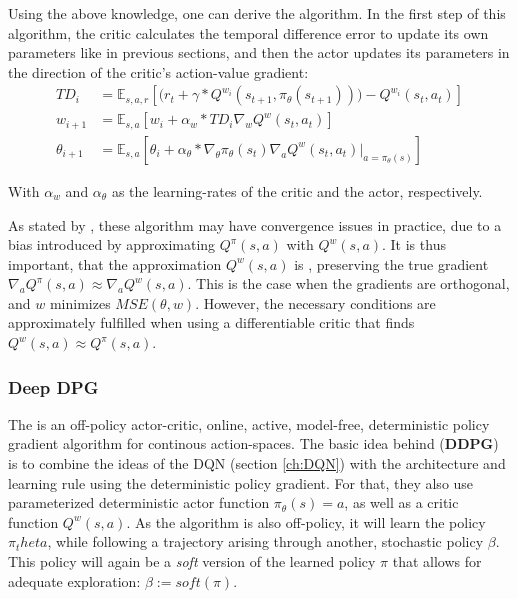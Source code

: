 \noindent Using the above knowledge, one can derive the  algorithm. In the first step of this algorithm, the critic calculates the temporal difference error to update its own parameters like in previous sections, and then the actor updates its parameters in the direction of the critic's action-value gradient:
\begin{align}
	TD_i    &= \mathds{E}_{s,a,r} \left[ \big( r_t + \gamma * Q^{w_i}(s_{t+1}, \pi_{\theta}(s_{t+1})) \big) - Q^{w_i}(s_t, a_t) \right] \label{eq:td_dpg}\\
	w_{i+1} &= \mathds{E}_{s,a} \left[  w_i + \alpha_w * TD_i \nabla_w Q^w(s_t, a_t) \right] \label{eq:critic_dpg} \\
	\theta_{i+1} &= \mathds{E}_{s,a} \left[ \theta_i + \alpha_\theta * \nabla_\theta \pi_\theta(s_t) \nabla_a Q^w(s_t,a_t) \big|_{a=\pi_\theta(s)} \right] \label{eq:actor_dpg}
\end{align}
\begin{flushright} \small With $\alpha_w$ and $\alpha_\theta$ as the learning-rates of the critic and the actor, respectively. \end{flushright}

As stated by \cite{silver_deterministic_2014}, these algorithm may have convergence issues in practice, due to a bias introduced by approximating $Q^\pi(s,a)$ with $Q^w(s,a)$. It is thus important, that the approximation $Q^w(s,a)$ is , preserving the true gradient $\nabla_a Q^\pi(s,a) \approx \nabla_a Q^w(s,a)$. This is the case when the gradients are orthogonal, and $w$ minimizes $MSE(\theta,w)$. However, the necessary conditions are approximately fulfilled when using a differentiable critic that finds $Q^w(s,a) \approx Q^\pi(s,a)$.


\subsubsection*{Deep DPG}

The  is an off-policy actor-critic, online, active, model-free, deterministic policy gradient algorithm for continous action-spaces. The basic idea behind  (\textbf{DDPG})\cite{lillicrap_continuous_2015} is to combine the ideas of the DQN (section \ref{ch:DQN}) with the architecture and learning rule using the deterministic policy gradient. For that, they also use parameterized deterministic actor function $\pi_\theta(s) = a$, as well as a critic function $Q^w(s,a)$. As the algorithm is also off-policy, it will learn the policy $\pi_theta$, while following a trajectory arising through another, stochastic policy $\beta$. This policy will again be a \textit{soft} version of the learned policy $\pi$ that allows for adequate exploration: $\beta := soft(\pi)$.

